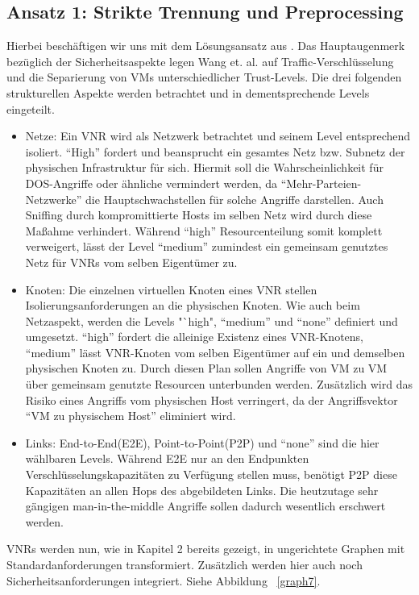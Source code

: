 \documentclass{lni}
\begin{document}
\subsection{Ansatz 1: Strikte Trennung und Preprocessing}
\label{subsec:ansatz1}

Hierbei beschäftigen wir uns mit dem Lösungsansatz aus \cite{wang2016towards}. 
Das Hauptaugenmerk bezüglich der Sicherheitsaspekte legen Wang et. al. auf Traffic-Verschlüsselung und die Separierung von VMs unterschiedlicher Trust-Levels. Die drei folgenden strukturellen Aspekte werden betrachtet und in dementsprechende Levels eingeteilt.
\begin{itemize}
\item Netze:\newline
Ein VNR wird als Netzwerk betrachtet und seinem Level entsprechend isoliert. "`High"' fordert und beansprucht ein gesamtes Netz bzw. Subnetz der physischen Infrastruktur für sich. Hiermit soll die Wahrscheinlichkeit für DOS-Angriffe oder ähnliche vermindert werden, da "`Mehr-Parteien-Netzwerke"' die Hauptschwachstellen für solche Angriffe darstellen. \cite{DOS} Auch Sniffing durch kompromittierte Hosts im selben Netz wird durch diese Maßahme verhindert. Während "`high"' Resourcenteilung somit komplett verweigert, lässt der Level "`medium"' zumindest ein gemeinsam genutztes Netz für VNRs vom selben Eigentümer zu.

\item Knoten:\newline
Die einzelnen virtuellen Knoten eines VNR stellen Isolierungsanforderungen an die physischen Knoten. Wie auch beim Netzaspekt, werden die Levels "`high", "`medium"' und "`none"' definiert und umgesetzt. "`high"' fordert die alleinige Existenz eines VNR-Knotens, "`medium"' lässt VNR-Knoten vom selben Eigentümer auf ein und demselben physischen Knoten zu. Durch diesen Plan sollen Angriffe von VM zu VM über gemeinsam genutzte Resourcen unterbunden werden. Zusätzlich wird das Risiko eines Angriffs vom physischen Host verringert, da der Angriffsvektor "`VM zu physischem Host"' eliminiert wird.

\item Links:\newline
End-to-End(E2E), Point-to-Point(P2P) und "`none"' sind die hier wählbaren Levels. Während E2E nur an den Endpunkten Verschlüsselungskapazitäten zu Verfügung stellen muss, benötigt P2P diese Kapazitäten an allen Hops des abgebildeten Links. Die heutzutage sehr gängigen man-in-the-middle Angriffe sollen dadurch wesentlich erschwert werden. 
\end{itemize}
VNRs werden nun, wie in Kapitel 2 bereits gezeigt, in ungerichtete Graphen mit Standardanforderungen transformiert. Zusätzlich werden hier auch noch Sicherheitsanforderungen integriert. Siehe Abbildung ~\ref{graph7}.\newline
\end{document}
